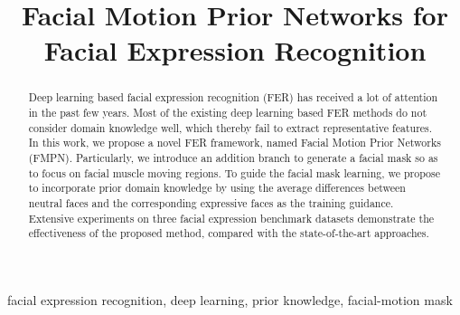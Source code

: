 \documentclass[conference,a4paper]{IEEEtran}
\begin{document}
\title{Facial Motion Prior Networks for \\ Facial Expression Recognition}






\author{

}







\maketitle


\begin{abstract}
Deep learning based facial expression recognition (FER) has received a lot of attention in the past few years. Most of the existing deep learning based FER methods do not consider domain knowledge well, which thereby fail to extract representative features. In this work, we propose a novel FER framework, named Facial Motion Prior Networks (FMPN). Particularly, we  introduce an addition branch to generate a facial mask so as to focus on facial muscle moving regions. To guide the facial mask learning, we propose to incorporate prior domain knowledge by using the average differences between neutral faces and the corresponding expressive faces as the training guidance. Extensive experiments on three facial expression benchmark datasets demonstrate the effectiveness of the proposed method, compared with the state-of-the-art approaches.
\end{abstract}


\begin{IEEEkeywords}
facial expression recognition, deep learning, prior knowledge, facial-motion mask
\end{IEEEkeywords}


\IEEEpeerreviewmaketitle
\end{document}

